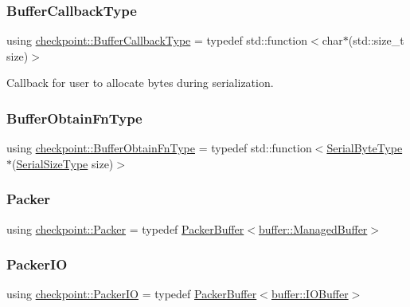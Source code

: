 \subsubsection{\texorpdfstring{Buffer\+Callback\+Type}{BufferCallbackType}}
{\footnotesize\ttfamily using \hyperlink{namespacecheckpoint_a70bc1b37eae8e32129df38d981ef90f6}{checkpoint\+::\+Buffer\+Callback\+Type} = typedef std\+::function$<$char$\ast$(std\+::size\+\_\+t size)$>$}



Callback for user to allocate bytes during serialization. 

\mbox{\label{namespacecheckpoint_a8a2558a1dd0db386339dd81c193b7f10}} 
\subsubsection{\texorpdfstring{Buffer\+Obtain\+Fn\+Type}{BufferObtainFnType}}
{\footnotesize\ttfamily using \hyperlink{namespacecheckpoint_a8a2558a1dd0db386339dd81c193b7f10}{checkpoint\+::\+Buffer\+Obtain\+Fn\+Type} = typedef std\+::function$<$\hyperlink{namespacecheckpoint_ae57f01cdc0b81776c23b6c7c934c58f5}{Serial\+Byte\+Type}$\ast$(\hyperlink{namespacecheckpoint_a083f6674da3f94c2901b18c6d238217c}{Serial\+Size\+Type} size)$>$}

\mbox{\label{namespacecheckpoint_ad744c208c7b1da6ee19c10d071e74f7d}} 
\subsubsection{\texorpdfstring{Packer}{Packer}}
{\footnotesize\ttfamily using \hyperlink{namespacecheckpoint_ad744c208c7b1da6ee19c10d071e74f7d}{checkpoint\+::\+Packer} = typedef \hyperlink{structcheckpoint_1_1_packer_buffer}{Packer\+Buffer}$<$\hyperlink{structcheckpoint_1_1buffer_1_1_managed_buffer}{buffer\+::\+Managed\+Buffer}$>$}

\mbox{\label{namespacecheckpoint_a0c8b3f2f174fd1076b410c7a2128919b}} 
\subsubsection{\texorpdfstring{Packer\+IO}{PackerIO}}
{\footnotesize\ttfamily using \hyperlink{namespacecheckpoint_a0c8b3f2f174fd1076b410c7a2128919b}{checkpoint\+::\+Packer\+IO} = typedef \hyperlink{structcheckpoint_1_1_packer_buffer}{Packer\+Buffer}$<$\hyperlink{structcheckpoint_1_1buffer_1_1_i_o_buffer}{buffer\+::\+I\+O\+Buffer}$>$}

